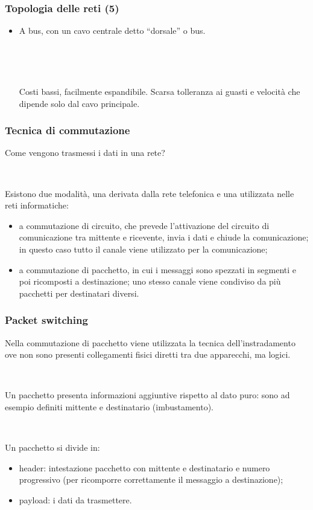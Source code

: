 \documentclass[]{beamer}
\begin{document}
\begin{frame}
\frametitle{Topologia delle reti (5)}
  \begin{itemize}
    \item A \alert<1->{bus}, con un cavo centrale detto ``dorsale'' o bus.
    
    ~

    \pause

    ~

    Costi bassi, facilmente espandibile. Scarsa tolleranza ai guasti e velocità che dipende solo dal cavo principale.
  \end{itemize}
\end{frame}


\begin{frame}
\frametitle{Tecnica di commutazione}
Come vengono trasmessi i dati in una rete?\pause

~

Esistono due modalità, una derivata dalla rete telefonica e una utilizzata nelle reti informatiche:
\begin{itemize}
  \item a \alert<2>{commutazione di circuito}, che prevede l'attivazione del circuito di comunicazione tra mittente e ricevente, invia i dati e chiude la comunicazione; in questo caso tutto il canale viene utilizzato per la comunicazione;\pause
  \item a \alert<3>{commutazione di pacchetto}, in cui i messaggi sono spezzati in segmenti e poi ricomposti a destinazione; uno stesso canale viene condiviso da più pacchetti per destinatari diversi.
\end{itemize}
\end{frame}


\begin{frame}
\frametitle{Packet switching}
Nella commutazione di pacchetto viene utilizzata la tecnica dell'\alert<1>{instradamento} ove non sono presenti collegamenti fisici diretti tra due apparecchi, ma logici.\pause

~

Un pacchetto presenta informazioni aggiuntive rispetto al dato puro: sono ad esempio definiti mittente e destinatario (imbustamento).\pause

~

Un pacchetto si divide in:
\begin{itemize}
  \item \alert<3>{header}: intestazione pacchetto con mittente e destinatario e numero progressivo (per ricomporre correttamente il messaggio a destinazione);\pause
  \item \alert<4>{payload}: i dati da trasmettere.
\end{itemize}
\end{frame}
\end{document}
